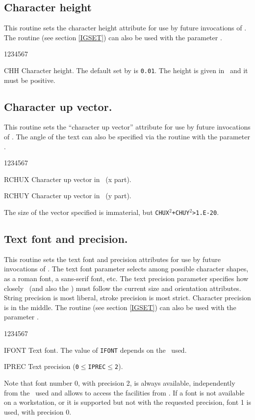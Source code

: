 \subsection{Character height}
\Action
This routine sets the character height attribute for use by future invocations
of . The routine  (see section \ref{IGSET}) can also be
used with the parameter .
\Pdesc
\begin{DLtt}{1234567}
\item[CHH] Character height. The default set by  is {\tt0.01}. The
           height is given in \WC~and it must be positive.
\end{DLtt}
%
\subsection{Character up vector.}
\Action
This routine sets the ``character up vector'' attribute for use by future
invocations of . The angle of the text can also be specified via the
 routine with the parameter .
\Pdesc
\begin{DLtt}{1234567}
\item[RCHUX] Character up vector in \WC~(x part).
\item[RCHUY] Character up vector in \WC~(y part).
\end{DLtt}
The size of the vector specified is immaterial, but
{\tt CHUX$^2$+CHUY$^2$>1.E-20}.
%
\subsection{Text font and precision.}
\Action
This routine sets the text font and precision attributes for use by future
invocations of . The text font parameter selects among possible
character shapes, as a roman font, a sans-serif font, etc. The text precision
parameter specifies how closely \HIGZ~(and also the \UGP) must follow the
current size and orientation attributes. String precision is most liberal,
stroke precision is most strict. Character precision is in the middle.
The routine  (see section \ref{IGSET}) can also be used with the
parameter .
\Pdesc
\begin{DLtt}{1234567}
\item[IFONT] Text font. The value of {\tt IFONT} depends on the \UGP~used.
\item[IPREC] Text precision ({\tt0\(\leq\)IPREC\(\leq\)2}).
\end{DLtt}
Note that font number 0, with precision 2, is always available, independently
from the \UGP~used and allows to access the  facilities from
. If a font is not available on a workstation, or it is supported
but not with the requested precision, font 1 is used, with precision 0.

